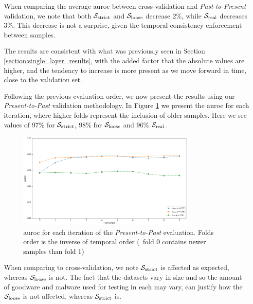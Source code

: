 When comparing the average \gls{auroc} between cross-validation and \textit{Past-to-Present} validation, we note that both $\mathcal{S}_{\mathrm{strict}}$ and $\mathcal{S}_{\mathrm{loose}}$ decrease 2\%, while $\mathcal{S}_{\mathrm{real}}$ decreases 3\%.
This decrease is not a surprise, given the temporal consistency enforcement between samples.

The results are consistent with what was previously seen in Section \ref{section:single_layer_results}, with the added factor that the absolute values are higher, and the tendency to increase is more present as we move forward in time, close to the validation set.

\medskip

Following the previous evaluation order, we now present the results using our \textit{Present-to-Past} validation methodology.
In Figure \ref{fig:presentpast_improved} we present the \gls{auroc} for each iteration, where higher folds represent the inclusion of older samples. Here we see values of 97\% for $\mathcal{S}_{\mathrm{strict}}$, 98\% for $\mathcal{S}_{\mathrm{loose}}$ and 96\% $\mathcal{S}_{\mathrm{real}}$.

\begin{figure}[!h]
	\centering
	\includegraphics[width=0.8\textwidth]{Figures/presentpast_improved.png}
	\caption[Multi layer results for dynamic features in \textit{Present-to-Past}.]{\gls{auroc} for each iteration of the \textit{Present-to-Past} evaluation. Folds order is the inverse of temporal order (\ie\ fold 0 contains newer samples than fold 1)}
	\label{fig:presentpast_improved}
\end{figure}

When comparing to cross-validation, we note $\mathcal{S}_{\mathrm{strict}}$ is affected as expected, whereas $\mathcal{S}_{\mathrm{loose}}$ is not.
The fact that the datasets vary in size and so the amount of goodware and malware used for testing in each may vary, can justify how the $\mathcal{S}_{\mathrm{loose}}$ is not affected, whereas $\mathcal{S}_{\mathrm{strict}}$ is.


